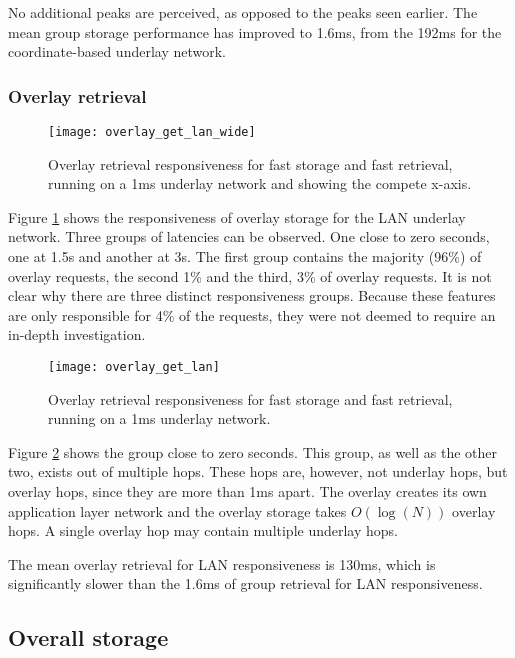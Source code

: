 No additional peaks are perceived, as opposed to the peaks seen earlier. The mean group storage performance has improved to 1.6ms, from the 192ms for the coordinate-based underlay network.

\subsubsection{Overlay retrieval}

\begin{figure}[htbp]
 \centering
 \texttt{[image: overlay\_get\_lan\_wide]}
 \caption{Overlay retrieval responsiveness for fast storage and fast retrieval, running on a 1ms underlay network and showing the compete x-axis.}
 \label{fig_overlay_get_lan_wide}
\end{figure}
%
Figure \ref{fig_overlay_get_lan_wide} shows the responsiveness of overlay storage for the LAN underlay network. Three groups of latencies can be observed. One close to zero seconds, one at 1.5s and another at 3s. The first group contains the majority (96\%) of overlay requests, the second 1\% and the third, 3\% of overlay requests. It is not clear why there are three distinct responsiveness groups. Because these features are only responsible for 4\% of the requests, they were not deemed to require an in-depth investigation.

\begin{figure}[htbp]
 \centering
 \texttt{[image: overlay\_get\_lan]}
 \caption{Overlay retrieval responsiveness for fast storage and fast retrieval, running on a 1ms underlay network.}
 \label{fig_overlay_get_lan}
\end{figure}
%
Figure \ref{fig_overlay_get_lan} shows the group close to zero seconds. This group, as well as the other two, exists out of multiple hops. These hops are, however, not underlay hops, but overlay hops, since they are more than 1ms apart. The overlay creates its own application layer network and the overlay storage takes $O(\log(N))$ overlay hops. A single overlay hop may contain multiple underlay hops.

The mean overlay retrieval for LAN responsiveness is 130ms, which is significantly slower than the 1.6ms of group retrieval for LAN responsiveness.

\subsection{Overall storage}

